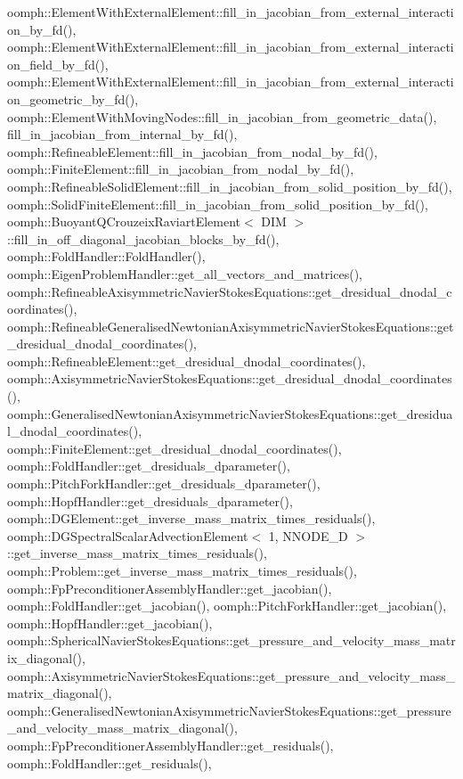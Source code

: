 oomph\+::\+Element\+With\+External\+Element\+::fill\+\_\+in\+\_\+jacobian\+\_\+from\+\_\+external\+\_\+interaction\+\_\+by\+\_\+fd(), oomph\+::\+Element\+With\+External\+Element\+::fill\+\_\+in\+\_\+jacobian\+\_\+from\+\_\+external\+\_\+interaction\+\_\+field\+\_\+by\+\_\+fd(), oomph\+::\+Element\+With\+External\+Element\+::fill\+\_\+in\+\_\+jacobian\+\_\+from\+\_\+external\+\_\+interaction\+\_\+geometric\+\_\+by\+\_\+fd(), oomph\+::\+Element\+With\+Moving\+Nodes\+::fill\+\_\+in\+\_\+jacobian\+\_\+from\+\_\+geometric\+\_\+data(), fill\+\_\+in\+\_\+jacobian\+\_\+from\+\_\+internal\+\_\+by\+\_\+fd(), oomph\+::\+Refineable\+Element\+::fill\+\_\+in\+\_\+jacobian\+\_\+from\+\_\+nodal\+\_\+by\+\_\+fd(), oomph\+::\+Finite\+Element\+::fill\+\_\+in\+\_\+jacobian\+\_\+from\+\_\+nodal\+\_\+by\+\_\+fd(), oomph\+::\+Refineable\+Solid\+Element\+::fill\+\_\+in\+\_\+jacobian\+\_\+from\+\_\+solid\+\_\+position\+\_\+by\+\_\+fd(), oomph\+::\+Solid\+Finite\+Element\+::fill\+\_\+in\+\_\+jacobian\+\_\+from\+\_\+solid\+\_\+position\+\_\+by\+\_\+fd(), oomph\+::\+Buoyant\+Q\+Crouzeix\+Raviart\+Element$<$ D\+I\+M $>$\+::fill\+\_\+in\+\_\+off\+\_\+diagonal\+\_\+jacobian\+\_\+blocks\+\_\+by\+\_\+fd(), oomph\+::\+Fold\+Handler\+::\+Fold\+Handler(), oomph\+::\+Eigen\+Problem\+Handler\+::get\+\_\+all\+\_\+vectors\+\_\+and\+\_\+matrices(), oomph\+::\+Refineable\+Axisymmetric\+Navier\+Stokes\+Equations\+::get\+\_\+dresidual\+\_\+dnodal\+\_\+coordinates(), oomph\+::\+Refineable\+Generalised\+Newtonian\+Axisymmetric\+Navier\+Stokes\+Equations\+::get\+\_\+dresidual\+\_\+dnodal\+\_\+coordinates(), oomph\+::\+Refineable\+Element\+::get\+\_\+dresidual\+\_\+dnodal\+\_\+coordinates(), oomph\+::\+Axisymmetric\+Navier\+Stokes\+Equations\+::get\+\_\+dresidual\+\_\+dnodal\+\_\+coordinates(), oomph\+::\+Generalised\+Newtonian\+Axisymmetric\+Navier\+Stokes\+Equations\+::get\+\_\+dresidual\+\_\+dnodal\+\_\+coordinates(), oomph\+::\+Finite\+Element\+::get\+\_\+dresidual\+\_\+dnodal\+\_\+coordinates(), oomph\+::\+Fold\+Handler\+::get\+\_\+dresiduals\+\_\+dparameter(), oomph\+::\+Pitch\+Fork\+Handler\+::get\+\_\+dresiduals\+\_\+dparameter(), oomph\+::\+Hopf\+Handler\+::get\+\_\+dresiduals\+\_\+dparameter(), oomph\+::\+D\+G\+Element\+::get\+\_\+inverse\+\_\+mass\+\_\+matrix\+\_\+times\+\_\+residuals(), oomph\+::\+D\+G\+Spectral\+Scalar\+Advection\+Element$<$ 1, N\+N\+O\+D\+E\+\_\+D $>$\+::get\+\_\+inverse\+\_\+mass\+\_\+matrix\+\_\+times\+\_\+residuals(), oomph\+::\+Problem\+::get\+\_\+inverse\+\_\+mass\+\_\+matrix\+\_\+times\+\_\+residuals(), oomph\+::\+Fp\+Preconditioner\+Assembly\+Handler\+::get\+\_\+jacobian(), oomph\+::\+Fold\+Handler\+::get\+\_\+jacobian(), oomph\+::\+Pitch\+Fork\+Handler\+::get\+\_\+jacobian(), oomph\+::\+Hopf\+Handler\+::get\+\_\+jacobian(), oomph\+::\+Spherical\+Navier\+Stokes\+Equations\+::get\+\_\+pressure\+\_\+and\+\_\+velocity\+\_\+mass\+\_\+matrix\+\_\+diagonal(), oomph\+::\+Axisymmetric\+Navier\+Stokes\+Equations\+::get\+\_\+pressure\+\_\+and\+\_\+velocity\+\_\+mass\+\_\+matrix\+\_\+diagonal(), oomph\+::\+Generalised\+Newtonian\+Axisymmetric\+Navier\+Stokes\+Equations\+::get\+\_\+pressure\+\_\+and\+\_\+velocity\+\_\+mass\+\_\+matrix\+\_\+diagonal(), oomph\+::\+Fp\+Preconditioner\+Assembly\+Handler\+::get\+\_\+residuals(), oomph\+::\+Fold\+Handler\+::get\+\_\+residuals(), 